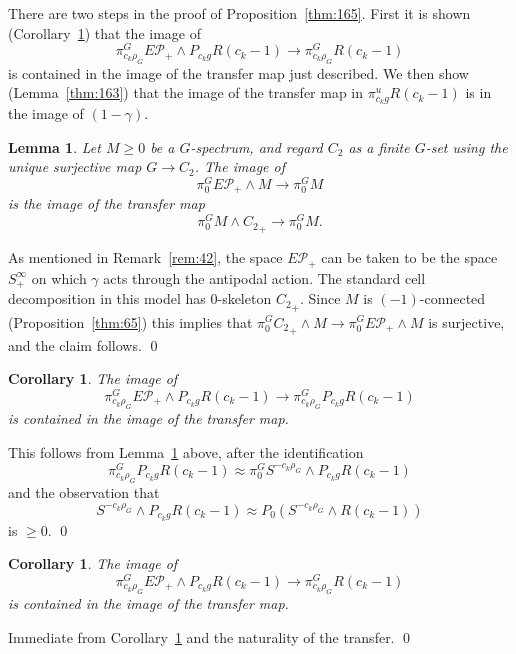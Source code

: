 \documentclass{amsart}
\newtheorem{cor}[equation]{Corollary}
\newtheorem{lem}[equation]{Lemma}
\theoremstyle{definition}
\theoremstyle{remark}
\newenvironment{pf}{\bigskip{\em Proof:\/}}{\qed\medskip}
\newcommand{\piu}{\pi^{u}}
\newcommand{\epfam}{E\pfamily_{+}}
\newcommand{\zt}{C_{2}}
\newcommand{\ckp}{c_{k}}
\newcommand{\ck}{c_{k}}
\newcommand{\pfamily}{\mathcal P}
\begin{document}
There are two steps in the proof of Proposition~\ref{thm:165}.  First
it is shown (Corollary~\ref{thm:164}) that the image of
\[
\pi^{G}_{\ckp\rho_{G}}\epfam\wedge P_{\ckp g}R(\ck-1)
\to \pi^{G}_{\ckp\rho_{G}}
R(\ck-1)
\]
is contained in the image of the transfer map just described.
We then show (Lemma~\ref{thm:163}) that the image of
the transfer map in $\piu_{\ckp g}R(\ck-1)$ is in the image of
$(1-\gamma)$.  

\begin{lem}
\label{thm:44} Let $M\ge 0$ be a $G$-spectrum, and regard $\zt$ as a
finite $G$-set using the unique surjective map $G\to\zt$.  The image of
\[
\pi^{G}_{0}\epfam\wedge
M\to\pi^{G}_{0}M
\]
is the image of the transfer map
\[
\pi^{G}_{0}M\wedge{\zt}_{+} \to
\pi^{G}_{0}M.
\]
\end{lem}

\begin{pf}
As mentioned in Remark~\ref{rem:42}, the space $\epfam$ can be taken
to be the space $S^{\infty}_{+}$ on which $\gamma$ acts through the
antipodal action.  The standard cell decomposition in this model has
$0$-skeleton ${\zt}_{+}$.  Since $M$ is $(-1)$-connected
(Proposition~\ref{thm:65}) this implies that
$\pi^{G}_{0}{\zt}_{+}\wedge M\to \pi^{G}_{0}\epfam\wedge M$ is
surjective, and the claim follows.
\end{pf}

\begin{cor}
\label{thm:43} The image of
\[
\pi^{G}_{\ckp\rho_{G}}\epfam\wedge P_{\ckp g}R(\ck-1) \to
\pi^{G}_{\ckp\rho_{G}}P_{\ckp g}R(\ck-1)
\]
is contained in the image of the transfer map.
\end{cor}

\begin{pf}
This follows from Lemma~\ref{thm:44} above, after the identification
\[
\pi^{G}_{\ckp\rho_{G}} P_{\ckp g}R(\ck-1) \approx
\pi^{G}_{0}S^{-\ckp\rho_{G}} \wedge P_{\ckp g}R(\ck-1)
\]
and the observation that
\[
S^{-\ckp\rho_{G}} \wedge P_{\ckp g}R(\ck-1) \approx
P_{0}(S^{-\ckp\rho_{G}} \wedge R(\ck-1))
\]
is $\ge 0$.
\end{pf}

\begin{cor}
\label{thm:164}
The image of
\[
\pi^{G}_{\ckp\rho_{G}}\epfam\wedge P_{\ckp g}R(\ck-1)
\to
\pi^{G}_{\ckp\rho_{G}}R(\ck-1)
\]
is contained in the image of the transfer map.
\end{cor}

\begin{pf}
Immediate from Corollary~\ref{thm:43} and the naturality of the transfer.
\end{pf}
\end{document}
